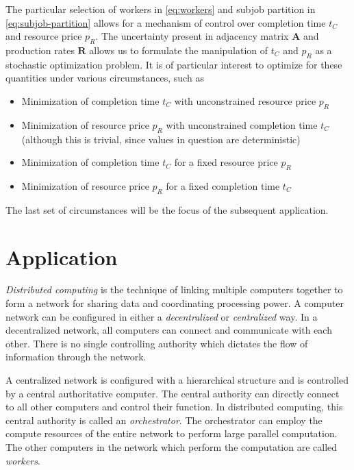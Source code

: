 \documentclass[../mthe-493-project-proposal.tex]{subfiles}
\begin{document}
    The particular selection of workers in \eqref{eq:workers} and subjob partition in \eqref{eq:subjob-partition} allows for a mechanism of control over completion time $t_C$ and resource price $p_R$. The uncertainty present in adjacency matrix $\mathbf{A}$ and production rates $\mathbf{R}$ allows us to formulate the manipulation of $t_C$ and $p_R$ as a stochastic optimization problem. It is of particular interest to optimize for these quantities under various circumstances, such as
    \begin{itemize}
        \item Minimization of completion time $t_C$ with unconstrained resource price $p_R$
        \item Minimization of resource price $p_R$ with unconstrained completion time $t_C$ (although this is trivial, since values in question are deterministic)
        \item Minimization of completion time $t_C$ for a fixed resource price $p_R$
        \item Minimization of resource price $p_R$ for a fixed completion time $t_C$
    \end{itemize}
    The last set of circumstances will be the focus of the subsequent application.

    \section{Application}

    \textit{Distributed computing} is the technique of linking multiple computers together to form a network for sharing data and coordinating processing power. A computer network can be configured in either a \textit{decentralized} or \textit{centralized} way. In a decentralized network, all computers can connect and communicate with each other. There is no single controlling authority which dictates the flow of information through the network.

    A centralized network is configured with a hierarchical structure and is controlled by a central authoritative computer. The central authority can directly connect to all other computers and control their function. In distributed computing, this central authority is called an \textit{orchestrator}. The orchestrator can employ the compute resources of the entire network to perform large parallel computation. The other computers in the network which perform the computation are called \textit{workers}.
    
\end{document}
